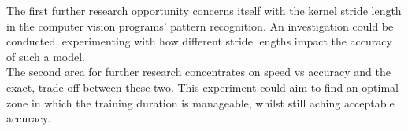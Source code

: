 The first further research opportunity concerns itself with the kernel stride length in the computer vision programs' pattern recognition. An investigation could be conducted, experimenting with how different stride lengths impact the accuracy of such a model.  \\

The second area for further research concentrates on speed vs accuracy and the exact, trade-off between these two. This experiment could aim to find an optimal zone in which the training duration is manageable, whilst still aching acceptable accuracy.  \\




